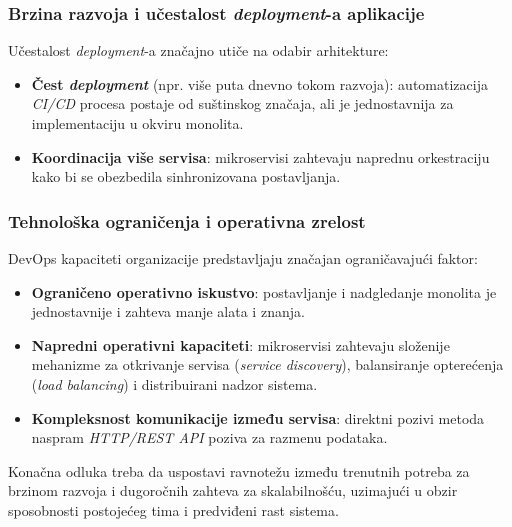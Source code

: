 \documentclass[12pt]{article}
\begin{document}
    \subsubsection*{Brzina razvoja i učestalost \textit{deployment}-a aplikacije}

    Učestalost \textit{deployment}-a značajno utiče na odabir arhitekture:
    \begin{itemize}
        \item \textbf{Čest \textit{deployment}} (npr. više puta dnevno tokom razvoja): automatizacija 
        \textit{CI/CD} procesa postaje od suštinskog značaja, ali je jednostavnija za 
        implementaciju u okviru monolita.
        \item \textbf{Koordinacija više servisa}: mikroservisi zahtevaju naprednu orkestraciju kako 
        bi se obezbedila sinhronizovana postavljanja.
    \end{itemize}

    \subsubsection*{Tehnološka ograničenja i operativna zrelost}

    DevOps kapaciteti organizacije predstavljaju značajan ograničavajući faktor:
    \begin{itemize}
        \item \textbf{Ograničeno operativno iskustvo}: postavljanje i nadgledanje monolita je 
        jednostavnije i zahteva manje alata i znanja.
        \item \textbf{Napredni operativni kapaciteti}: mikroservisi zahtevaju složenije mehanizme 
        za otkrivanje servisa (\textit{service discovery}), balansiranje 
        opterećenja (\textit{load balancing}) i distribuirani nadzor sistema.
        \item \textbf{Kompleksnost komunikacije između servisa}: direktni pozivi metoda naspram 
        \textit{HTTP/REST API} poziva za razmenu podataka.
    \end{itemize}

    Konačna odluka treba da uspostavi ravnotežu između trenutnih potreba za brzinom razvoja i 
    dugoročnih zahteva za skalabilnošću, uzimajući u obzir sposobnosti postojećeg tima i 
    predviđeni rast sistema.



\newpage
\printbibliography[title={Literatura}]
\end{document}
